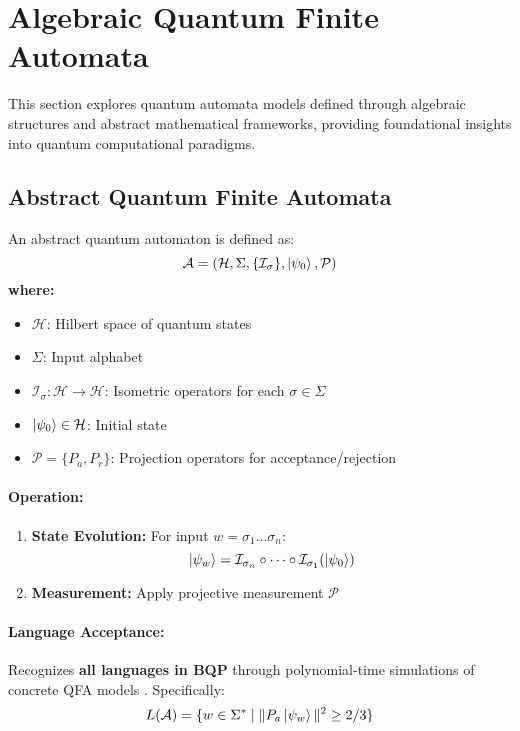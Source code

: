 \section{Algebraic Quantum Finite Automata}
\label{sec:abstract-qfa}

This section explores quantum automata models defined through algebraic structures and abstract mathematical frameworks, providing foundational insights into quantum computational paradigms.

\subsection{Abstract Quantum Finite Automata}
\label{subsec:abstract-qfa}

\begin{definition}
An abstract quantum automaton is defined as:
\[
\mathcal{A} = (\mathcal{H}, \Sigma, \{\mathcal{I}_\sigma\}, \ket{\psi_0}, \mathcal{P})
\]
\textbf{where:}
\begin{itemize}
    \item $\mathcal{H}$: Hilbert space of quantum states
    \item $\Sigma$: Input alphabet
    \item $\mathcal{I}_\sigma: \mathcal{H} \rightarrow \mathcal{H}$: Isometric operators for each $\sigma \in \Sigma$
    \item $\ket{\psi_0} \in \mathcal{H}$: Initial state
    \item $\mathcal{P} = \{P_a, P_r\}$: Projection operators for acceptance/rejection
\end{itemize}
\end{definition}

\paragraph{Operation:}
\begin{enumerate}
    \item \textbf{State Evolution:} For input $w = \sigma_1...\sigma_n$:
    \[
    \ket{\psi_w} = \mathcal{I}_{\sigma_n} \circ \cdots \circ \mathcal{I}_{\sigma_1} (\ket{\psi_0})
    \]
    \item \textbf{Measurement:} Apply projective measurement $\mathcal{P}$
\end{enumerate}

\paragraph{Language Acceptance:}
Recognizes \textbf{all languages in BQP} through polynomial-time simulations of concrete QFA models \cite{manin1980computable, gruska2005}. Specifically:
\[
L(\mathcal{A}) = \{w \in \Sigma^* \mid \|P_a\ket{\psi_w}\|^2 \geq 2/3\}
\]

